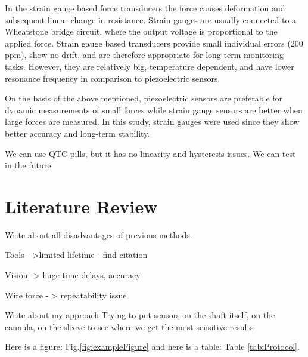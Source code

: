 In the strain gauge based force transducers the force causes deformation and subsequent linear change in resistance. Strain gauges are usually connected to a Wheatstone bridge circuit, where the output voltage is proportional to the applied force. Strain gauge based transducers provide small individual errors (200 ppm), show no drift, and are therefore appropriate for long-term monitoring tasks. However, they are relatively big, temperature dependent, and have lower resonance frequency in comparison to piezoelectric sensors. \cite{SGandP1,SGandP2}

On the basis of the above mentioned, piezoelectric sensors are preferable for dynamic measurements of small forces while strain gauge sensors are better when large forces are measured. In this study, strain gauges were used since they show better accuracy and long-term stability. \cite{SGandP1,SGandP2}

We can use QTC-pills, but it has no-linearity and hysteresis issues. We can test in the future.


\section{Literature Review}
\label{sec:LitRev}

Write about all disadvantages of previous methods.

Tools - >limited lifetime - find citation

Vision -> huge time delays, accuracy

Wire force - > repeatability issue

Write about my approach
Trying to put sensors on the shaft itself, on the cannula, on the sleeve to see where we get the most sensitive results

Here is a figure: Fig.\ref{fig:exampleFigure} and here is a table: Table \ref{tab:Protocol}.

